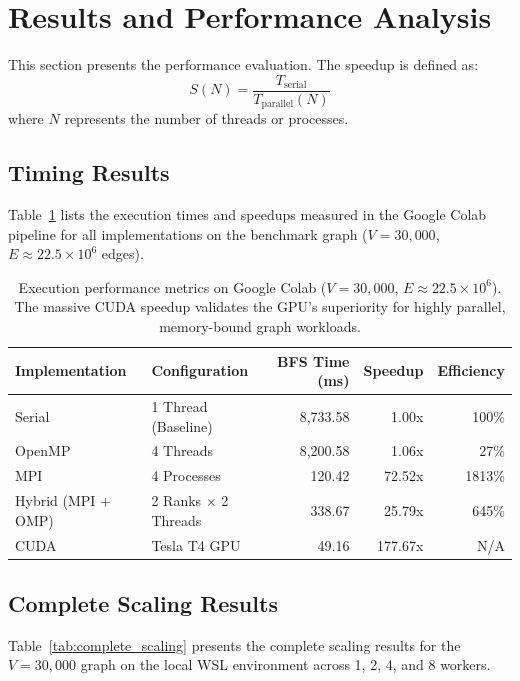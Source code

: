 \documentclass[12pt, a4paper]{article}
\begin{document}
\section{Results and Performance Analysis}

This section presents the performance evaluation. The speedup is defined as:
\begin{equation}
S(N) = \frac{T_{\text{serial}}}{T_{\text{parallel}}(N)}
\end{equation}
where $N$ represents the number of threads or processes.

\subsection{Timing Results}
Table~\ref{tab:timing} lists the execution times and speedups measured in the Google Colab pipeline for all implementations on the benchmark graph ($V = 30,000$, $E \approx 22.5 \times 10^6$ edges).

\begin{table}[H]
\centering
\begin{tabular}{@{}lp{4.5cm}rrr@{}}
\toprule
\textbf{Implementation} & \textbf{Configuration} & \textbf{BFS Time (ms)} & \textbf{Speedup} & \textbf{Efficiency} \\
\midrule
Serial & 1 Thread (Baseline) & 8,733.58 & 1.00x & 100\% \\
OpenMP & 4 Threads & 8,200.58 & 1.06x & 27\% \\
MPI & 4 Processes & 120.42 & 72.52x & 1813\% \\
Hybrid (MPI + OMP) & 2 Ranks $\times$ 2 Threads & 338.67 & 25.79x & 645\% \\
CUDA & Tesla T4 GPU & 49.16 & 177.67x & N/A \\
\bottomrule
\end{tabular}
\caption{Execution performance metrics on Google Colab ($V=30,000$, $E \approx 22.5 \times 10^6$). The massive CUDA speedup validates the GPU's superiority for highly parallel, memory-bound graph workloads.}
\label{tab:timing}
\end{table}

\subsection{Complete Scaling Results}
Table~\ref{tab:complete_scaling} presents the complete scaling results for the $V = 30,000$ graph on the local WSL environment across 1, 2, 4, and 8 workers. 
\end{document}
